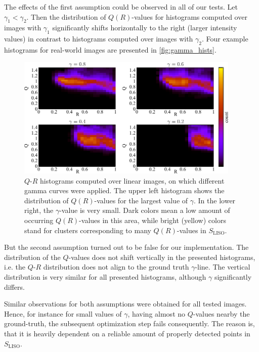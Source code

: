 The effects of the first assumption could be observed in all of our tests. Let $\gamma_1 < \gamma_2$. Then the distribution of $Q(R)$-values for histograms computed over images with $\gamma_1$ significantly shifts horizontally to the right (larger intensity values) in contrast to histograms computed over images with $\gamma_2$. Four example histograms for real-world images are presented in \autoref{fig:gamma_hists}.

\begin{figure}[tb]
	\centering
		\includegraphics[width=0.95\textwidth]{histograms/geoinv_QR-diagramme.pdf}
	\caption[$Q$-$R$ histograms computed over images for different $\gamma$ curves]{$Q$-$R$ histograms computed over linear images, on which different gamma curves were applied. The upper left histogram shows the distribution of $Q(R)$-values for the largest value of $\gamma$. In the lower right, the $\gamma$-value is very small. Dark colors mean a low amount of occurring $Q(R)$-values in this area, while bright (yellow) colors stand for clusters corresponding to many $Q(R)$-values in $S_\text{LISO}$.}
	\label{fig:gamma_hists}
\end{figure}

But the second assumption turned out to be false for our implementation. The distribution of the $Q$-values does not shift vertically in the presented histograms, \hbox{i.e.} the $Q$-$R$ distribution does not align to the ground truth $\gamma$-line. The vertical distribution is very similar for all presented histograms, although $\gamma$ significantly differs.

Similar observations for both assumptions were obtained for all tested images. Hence, for instance for small values of $\gamma$, having almost no $Q$-values nearby the ground-truth, the subsequent optimization step fails consequently. The reason is, that it is heavily dependent on a reliable amount of properly detected points in $S_\text{LISO}$.



